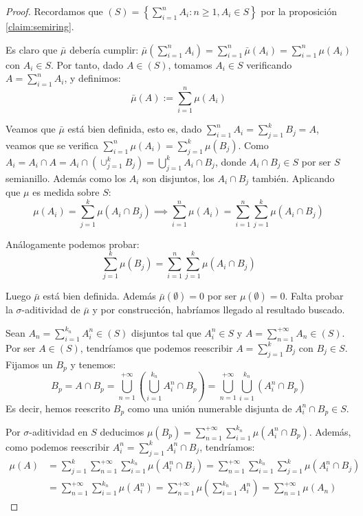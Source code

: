   \begin{proof}
   Recordamos que $(S) = \left\{\sum_{i=1}^n A_i: n\ge 1, A_i \in S \right\}$ por la proposición \ref{claim:semiring}.
   
   Es claro que $\bar{\mu}$ debería cumplir: 
   $\bar{\mu}\left(\sum_{i=1}^n A_i\right) = \sum_{i=1}^n \bar{\mu}(A_i) = \sum_{i=1}^n \mu(A_i)$
   con $A_i \in S$. Por tanto, dado $A\in (S)$, tomamos $A_i\in S$ verificando $A = \sum_{i=1}^n A_i$, y definimos: 
   \[
     \bar{\mu}(A) := \sum_{i=1}^n \mu(A_i)
   \]
   
   Veamos que $\bar{\mu}$ está bien definida, esto es, dado $\sum_{i=1}^n A_i = \sum_{j=1}^k B_j = A$, 
   veamos que se verifica $\sum_{i=1}^n \mu(A_i) = \sum_{j=1}^k \mu(B_j)$.
   Como $A_i = A_i \cap A = A_i \cap \left(\cup_{j=1}^k B_j\right) = \bigcup_{j=1}^k A_i \cap B_j$, donde 
   $A_i \cap B_j \in S$ por ser $S$ semianillo. Además como los $A_i$ son disjuntos, los $A_i\cap B_j$ también.
   Aplicando que $\mu$ es medida sobre $S$:
   \[
     \mu(A_i) = \sum_{j=1}^k \mu(A_i \cap B_j) \implies \sum_{i=1}^n \mu(A_i) = 
                \sum_{i=1}^n \sum_{j=1}^k \mu(A_i \cap B_j)
   \]
   
   Análogamente podemos probar:
   \[
     \sum_{j=1}^k \mu(B_j) = \sum_{i=1}^n \sum_{j=1}^k \mu(A_i \cap B_j)
   \]
   
   Luego $\bar{\mu}$ está bien definida. Además $\bar{\mu} (\emptyset) = 0$ por ser $\mu(\emptyset) = 0$.
   Falta probar la $\sigma$-aditividad de $\bar{\mu}$ y por construcción, habríamos llegado al resultado buscado.
   
   Sean $A_n = \sum_{i=1}^{k_n} A_i^n \in (S)$ disjuntos tal que $A_i^n \in S$ y $A = \sum_{n=1}^{+\infty} A_n \in (S)$. 
   Por ser $A \in (S)$, tendríamos que podemos reescribir $A = \sum_{j=1}^k B_j$ con $B_j \in S$.
   Fijamos un $B_p$ y tenemos:
   \[
     B_p = A \cap B_p = \bigcup_{n=1}^{+\infty} \left(\bigcup_{i=1}^{k_n} A_i^n \cap B_p\right) = 
             \bigcup_{n=1}^{+\infty} \bigcup_{i=1}^{k_n} \left(A_i^n \cap B_p\right)
   \]
   Es decir, hemos reescrito $B_p$ como una unión numerable disjunta de $A_i^n \cap B_p \in S$.
   
   Por $\sigma$-aditividad en $S$ deducimos $\mu(B_p) = \sum_{n=1}^{+\infty} \sum_{i=1}^{k_n} \mu(A_i^n \cap B_p)$.
   Además, como podemos reescribir $A_i^{n} = \sum_{j=1}^k A_i^{n} \cap B_j$, tendríamos:
   \begin{align*}
   \mu(A) &= \sum_{j=1}^k \sum_{n=1}^{+\infty} \sum_{i=1}^{k_n} \mu(A_i^n \cap B_j) =
             \sum_{n=1}^{+\infty} \sum_{i=1}^{k_n} \sum_{j=1}^k \mu(A_i^n \cap B_j)\\
          &= \sum_{n=1}^{+\infty} \sum_{i=1}^{k_n} \mu(A_i^n) =
             \sum_{n=1}^{+\infty} \mu \left(\sum_{i=1}^{k_n} A_i^n \right) =
             \sum_{n=1}^{+\infty} \mu(A_n)
   \end{align*}
  \end{proof}

